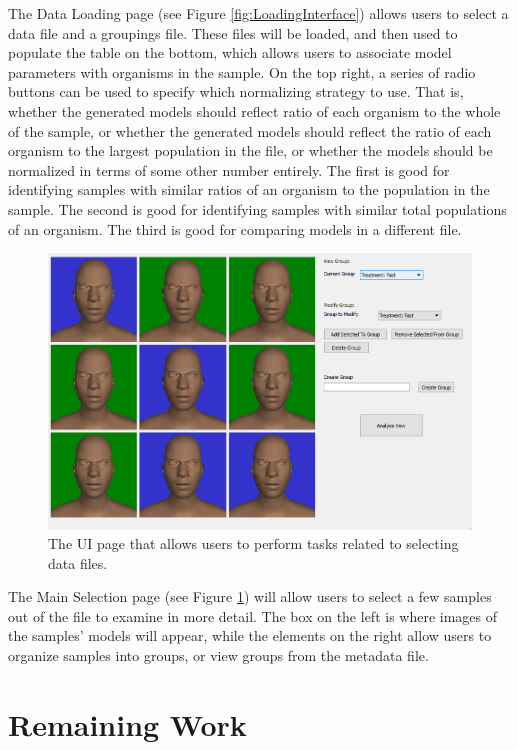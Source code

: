 \documentclass[letterpaper,10pt, onecolumn, draftclsnofoot]{IEEEtran}
\begin{document}
The Data Loading page (see Figure \ref{fig:LoadingInterface}) allows users to select a data file and a groupings file. These files will be loaded, and then used to populate the table on the bottom, which allows users to associate model parameters with organisms in the sample. On the top right, a series of radio buttons can be used to specify which normalizing strategy to use. That is, whether the generated models should reflect ratio of each organism to the whole of the sample, or whether the generated models should reflect the ratio of each organism to the largest population in the file, or whether the models should be normalized in terms of some other number entirely. The first is good for identifying samples with similar ratios of an organism to the population in the sample. The second is good for identifying samples with similar total populations of an organism. The third is good for comparing models in a different file.

\begin{figure}
	\includegraphics[width=\textwidth]{Comparison.PNG}
	\caption{The UI page that allows users to perform tasks related to selecting data files.}
	\label{fig:MainInterface}
\end{figure}

The Main Selection page (see Figure \ref{fig:MainInterface}) will allow users to select a few samples out of the file to examine in more detail. The box on the left is where images of the samples' models will appear, while the elements on the right allow users to organize samples into groups, or view groups from the metadata file.

\section{Remaining Work}\label{rWork}
\end{document}
